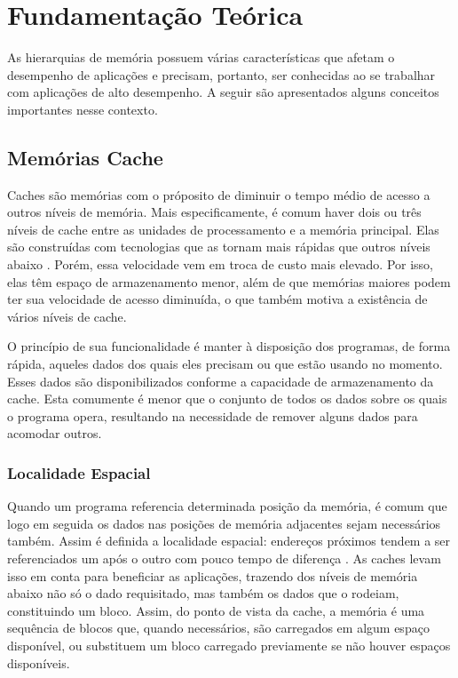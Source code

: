 \chapter{Fundamentação Teórica}
\label{cap:fundamentacao_teorica}
\acresetall


As hierarquias de memória possuem várias características que afetam o desempenho de aplicações e precisam, portanto, ser conhecidas ao se trabalhar com aplicações de alto desempenho.
A seguir são apresentados alguns conceitos importantes nesse contexto.



\section{Memórias Cache}
\label{sec:memorias_cache}

Caches são memórias com o próposito de diminuir o tempo médio de acesso a outros níveis de memória. Mais especificamente, é comum haver dois ou três níveis de cache entre as unidades de processamento e a memória principal. Elas são construídas com tecnologias que as tornam mais rápidas que outros níveis abaixo \cite{Patterson}. Porém, essa velocidade vem em troca de custo mais elevado. Por isso, elas têm espaço de armazenamento menor, além de que memórias maiores podem ter sua velocidade de acesso diminuída, o que também motiva a existência de vários níveis de cache.

O princípio de sua funcionalidade é manter à disposição dos programas, de forma rápida, aqueles dados dos quais eles precisam ou que estão usando no momento. Esses dados são disponibilizados conforme a capacidade de armazenamento da cache. Esta comumente é menor que o conjunto de todos os dados sobre os quais o programa opera, resultando na necessidade de remover alguns dados para acomodar outros.

\subsection{Localidade Espacial}
\label{subsec:localidade_espacial}

Quando um programa referencia determinada posição da memória, é comum que logo em seguida os dados nas posições de memória adjacentes sejam necessários também. Assim é definida a localidade espacial: endereços próximos tendem a ser referenciados um após o outro com pouco tempo de diferença \cite{Patterson}. As caches levam isso em conta para beneficiar as aplicações, trazendo dos níveis de memória abaixo não só o dado requisitado, mas também os dados que o rodeiam, constituindo um bloco. Assim, do ponto de vista da cache, a memória é uma sequência de blocos que, quando necessários, são carregados em algum espaço disponível, ou substituem um bloco carregado previamente se não houver espaços disponíveis.

